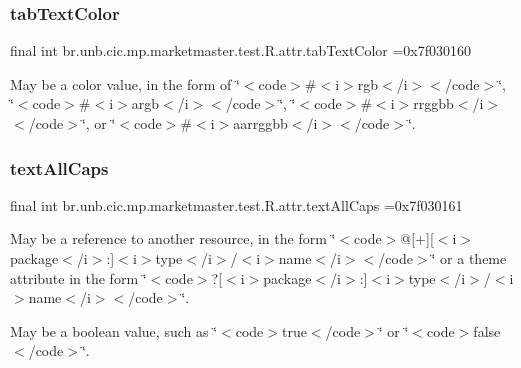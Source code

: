\subsubsection{\texorpdfstring{tab\+Text\+Color}{tabTextColor}}
{\footnotesize\ttfamily final int br.\+unb.\+cic.\+mp.\+marketmaster.\+test.\+R.\+attr.\+tab\+Text\+Color =0x7f030160\hspace{0.3cm}{\ttfamily [static]}}

May be a color value, in the form of \char`\"{}$<$code$>$\#$<$i$>$rgb$<$/i$>$$<$/code$>$\char`\"{}, \char`\"{}$<$code$>$\#$<$i$>$argb$<$/i$>$$<$/code$>$\char`\"{}, \char`\"{}$<$code$>$\#$<$i$>$rrggbb$<$/i$>$$<$/code$>$\char`\"{}, or \char`\"{}$<$code$>$\#$<$i$>$aarrggbb$<$/i$>$$<$/code$>$\char`\"{}. \mbox{\label{classbr_1_1unb_1_1cic_1_1mp_1_1marketmaster_1_1test_1_1R_1_1attr_a2fffd9820692082ec60772bcfdfaf116}} 
\subsubsection{\texorpdfstring{text\+All\+Caps}{textAllCaps}}
{\footnotesize\ttfamily final int br.\+unb.\+cic.\+mp.\+marketmaster.\+test.\+R.\+attr.\+text\+All\+Caps =0x7f030161\hspace{0.3cm}{\ttfamily [static]}}

May be a reference to another resource, in the form \char`\"{}$<$code$>$@\mbox{[}+\mbox{]}\mbox{[}$<$i$>$package$<$/i$>$\+:\mbox{]}$<$i$>$type$<$/i$>$/$<$i$>$name$<$/i$>$$<$/code$>$\char`\"{} or a theme attribute in the form \char`\"{}$<$code$>$?\mbox{[}$<$i$>$package$<$/i$>$\+:\mbox{]}$<$i$>$type$<$/i$>$/$<$i$>$name$<$/i$>$$<$/code$>$\char`\"{}. 

May be a boolean value, such as \char`\"{}$<$code$>$true$<$/code$>$\char`\"{} or \char`\"{}$<$code$>$false$<$/code$>$\char`\"{}. \mbox{\label{classbr_1_1unb_1_1cic_1_1mp_1_1marketmaster_1_1test_1_1R_1_1attr_a55012aef5fc70f0df045243cc8697c76}} 
